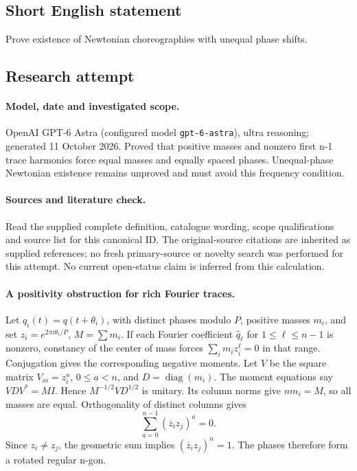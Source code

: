 \documentclass[11pt]{article}
\begin{document}
\subsection{Short English statement}
Prove existence of Newtonian choreographies with unequal phase shifts.
\subsection{Research attempt}
\paragraph{Model, date and investigated scope.}
OpenAI GPT-6 Astra (configured model \texttt{gpt-6-astra}), ultra reasoning; generated 11 October 2026. Proved that positive masses and nonzero first n-1 trace harmonics force equal masses and equally spaced phases. Unequal-phase Newtonian existence remains unproved and must avoid this frequency condition.

\paragraph{Sources and literature check.}
Read the supplied complete definition, catalogue wording, scope qualifications and source list for this canonical ID. The original-source citations are inherited as supplied references; no fresh primary-source or novelty search was performed for this attempt. No current open-status claim is inferred from this calculation.

\paragraph{A positivity obstruction for rich Fourier traces.}Let \(q_i(t)=q(t+\theta_i)\), with distinct phases modulo \(P\), positive masses \(m_i\), and set \(z_i=e^{2\pi i\theta_i/P}\), \(M=\sum m_i\). If each Fourier coefficient \(\widehat q_\ell\) for \(1\le\ell\le n-1\) is nonzero, constancy of the center of mass forces \(\sum_im_i z_i^\ell=0\) in that range. Conjugation gives the corresponding negative moments.
Let \(V\) be the square matrix \(V_{ai}=z_i^a\), \(0\le a<n\), and \(D=\operatorname{diag}(m_i)\). The moment equations say \(VDV^*=MI\). Hence \(M^{-1/2}VD^{1/2}\) is unitary. Its column norms give \(nm_i=M\), so all masses are equal. Orthogonality of distinct columns gives
\[\sum_{a=0}^{n-1}(\overline z_i z_j)^a=0.
\]
Since \(z_i\ne z_j\), the geometric sum implies \((\overline z_i z_j)^n=1\). The phases therefore form a rotated regular n-gon.
\end{document}
